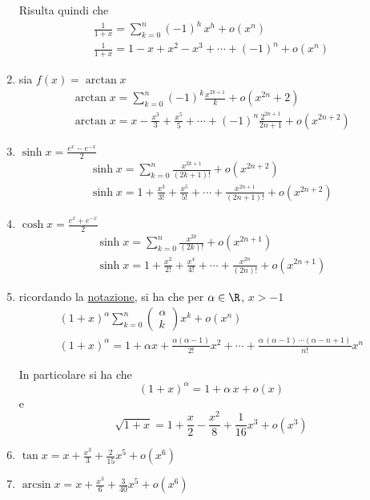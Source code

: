 \begin{enumerate}
    Risulta quindi che \begin{gather*}
        \frac{1}{1+x}=\sum_{k=0}^{n} (-1)^{h}\,x^{h} +o(x^{n})\\
        \frac{1}{1+x}=1-x+x^{2}-x^{3}+\cdots+(-1)^{n}+o(x^{n} )
    \end{gather*}
    \item sia $ f(x)=\arctan x $\begin{gather*}
        \arctan x = \sum_{k=0}^{n} (-1)^{k}\frac{x^{2k+1}}{k}+o(x^{2n}+2)\\
        \arctan x = x-\frac{x^{3}}{3}+\frac{x^{5}}{5}+ \cdots+(-1)^{n}\frac{2^{2n+1}}{2n+1}+o(x^{2n+2})
    \end{gather*}
    \item $ \sinh x = \frac{e^{x}-e^{-x}}{2} $ \begin{gather*}
        \sinh x =\sum_{k=0}^{n}\frac{x^{2k+1}}{(2k+1)!}+o(x^{2n+2})\\
        \sinh x = 1 + \frac{x^{3}}{3!}+\frac{x^{5}}{5!}+\cdots+ \frac{x^{2n+1}}{(2n+1)!}+o(x^{2n+2})
    \end{gather*}
    \item$ \cosh x = \frac{e^{x}+e^{-x}}{2} $ \begin{gather*}
        \sinh x =\sum_{k=0}^{n}\frac{x^{2k}}{(2k)!}+o(x^{2n+1})\\
        \sinh x = 1 + \frac{x^{2}}{2!}+\frac{x^{4}}{4!}+\cdots+ \frac{x^{2n}}{(2n)!}+o(x^{2n+1})
    \end{gather*}
    \item ricordando la \hyperref[binomiale]{notazione}, si ha che per $ \alpha \in \R $, $ x>-1 $ \begin{gather*}
        (1+x)^{\alpha}\sum_{k=0}^{n}  \begin{pmatrix}
            \alpha\\ k
        \end{pmatrix} x^{k} + o(x^{n})\\
        (1+x)^{\alpha}=1+\alpha x + \frac{\alpha(\alpha -1)}{2!}x^{2}+\cdots+ \frac{\alpha\,(\alpha-1)\,\cdots(\alpha-n+1)}{n!}x^{n}
    \end{gather*}

    In particolare si ha che \[
        (1+x)^{\alpha}=1+\alpha\,x + o(x)
    \] e \[
        \sqrt{1+x}=1+\frac{x}{2}-\frac{x^{2}}{8}+\frac{1}{16}x^{3}+o(x^{3})
    \]
    \item $\displaystyle \tan x = x + \frac{x^{3}}{3} + \frac{2}{15}x^{5}+o(x^{6})$
    \item $ \displaystyle \arcsin x = x + \frac{x^{3}}{6}+ \frac{3}{40}x^{5}+o(x^{6}) $
\end{enumerate}


